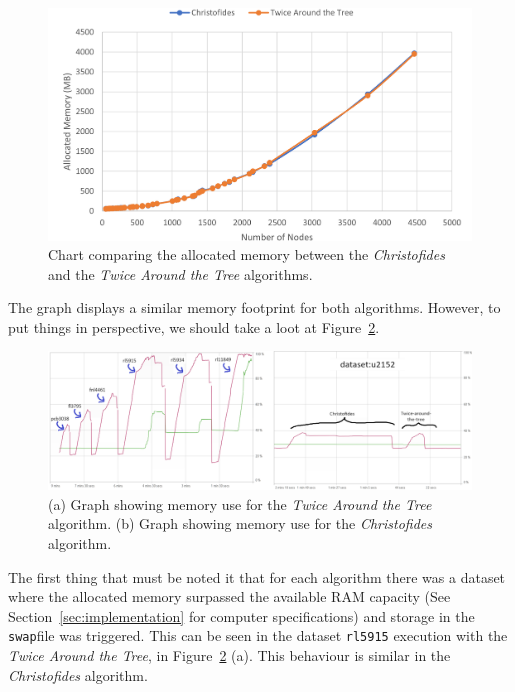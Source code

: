 \documentclass[12pt]{article}
\begin{document}
\begin{figure}[ht]
\centering
\includegraphics[height=.325\textheight]{images/memory_use_comparison.png}
\caption{Chart comparing the allocated memory between the \textit{Christofides} and the \textit{Twice Around the Tree} algorithms.}
\label{fig:mem_use}
\end{figure}

The graph displays a similar memory footprint for both algorithms. However, to put things in perspective, 
we should take a loot at Figure~\ref{fig:memory_behaviour}.

\begin{figure}[ht]
\centering
\includegraphics[width=\textwidth]{images/memory_profile_comparison.png}
\caption{(a) Graph showing memory use for the \textit{Twice Around the Tree} algorithm. (b) Graph showing memory use for the \textit{Christofides} algorithm.}
\label{fig:memory_behaviour}
\end{figure}

The first thing that must be noted it that for each algorithm there was a dataset where the allocated memory surpassed 
the available RAM capacity (See Section~\ref{sec:implementation} for computer specifications) and storage in the \texttt{swap}\footnotemark file was triggered. This can be seen in the dataset \texttt{rl5915} execution with the \textit{Twice Around the Tree}, 
in Figure~\ref{fig:memory_behaviour} (a). This behaviour is similar in the \textit{Christofides} algorithm.
\end{document}
